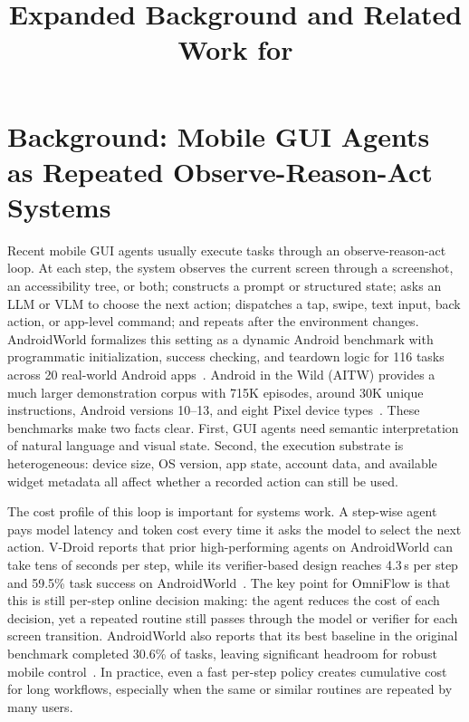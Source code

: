 \documentclass[sigplan,10pt]{acmart}
\title{Expanded Background and Related Work for \sysname}
\author{}
\date{}
\newcommand{\sysname}{OmniFlow\xspace}
\begin{document}
\maketitle

\section{Background: Mobile GUI Agents as Repeated Observe-Reason-Act Systems}

Recent mobile GUI agents usually execute tasks through an
observe-reason-act loop. At each step, the system observes the current screen
through a screenshot, an accessibility tree, or both; constructs a prompt or
structured state; asks an LLM or VLM to choose the next action; dispatches a
tap, swipe, text input, back action, or app-level command; and repeats after the
environment changes. AndroidWorld formalizes this setting as a dynamic Android
benchmark with programmatic initialization, success checking, and teardown logic
for 116 tasks across 20 real-world Android apps~\cite{rawles2025androidworld}.
Android in the Wild (AITW) provides a much larger demonstration corpus with
715K episodes, around 30K unique instructions, Android versions 10--13, and
eight Pixel device types~\cite{rawles2023android}. These benchmarks make two
facts clear. First, GUI agents need semantic interpretation of natural language
and visual state. Second, the execution substrate is heterogeneous: device size,
OS version, app state, account data, and available widget metadata all affect
whether a recorded action can still be used.

The cost profile of this loop is important for systems work. A step-wise agent
pays model latency and token cost every time it asks the model to select the
next action. V-Droid reports that prior high-performing agents on AndroidWorld
can take tens of seconds per step, while its verifier-based design reaches
4.3\,s per step and 59.5\% task success on
AndroidWorld~\cite{dai2025advancing}. The key point for \sysname is that this is
still per-step online decision making: the agent reduces the cost of each
decision, yet a repeated routine still passes through the model or verifier for
each screen transition. AndroidWorld also reports that its best baseline in the
original benchmark completed 30.6\% of tasks, leaving significant headroom for
robust mobile control~\cite{rawles2025androidworld}. In practice, even a fast
per-step policy creates cumulative cost for long workflows, especially when the
same or similar routines are repeated by many users.
\end{document}
